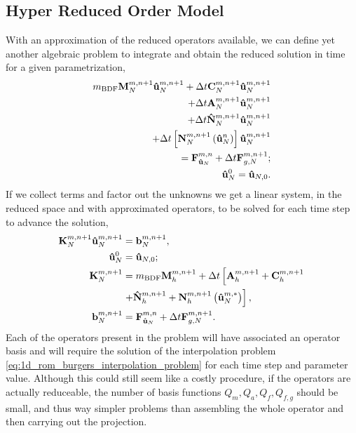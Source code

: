 \documentclass[../../thesis.tex]{subfiles}
\newcommand{\dt}{\ensuremath{\Delta t}}
\newcommand{\Ahm}[1]{\ensuremath{\vb{#1}^{m, n+1}_h}}
\begin{document}
\subsection{Hyper Reduced Order Model}
With an approximation of the reduced operators available, 
we can define yet another algebraic problem to integrate and 
obtain the reduced solution in time for a given parametrization,
\begin{subequations}
    \label{eq:1d_hrom_weak_formulation_discrete}
    \begin{align}
        m_{\text{BDF}} \vb{M}^{m, n+1}_{N} \vb{\hat{u}}_{N}^{m, n+1}
        + \dt \vb{C}^{m, n+1}_{N} \vb{\hat{u}}_{N}^{m, n+1}
        \nonumber 
        \\ 
        + \dt \vb{A}^{m, n+1}_{N} \vb{\hat{u}}_{N}^{m, n+1}
        \nonumber 
        \\ 
        + \dt \vb{\hat{N}}^{m, n+1}_{N} \vb{\hat{u}}_{N}^{m, n+1}
        \nonumber 
        \\ 
        + \dt \left[\vb{N}^{m, n+1}_{N}\left(\vb{\hat{u}}_{N}^{n}\right)\right] \vb{\hat{u}}_{N}^{m, n+1}
        \nonumber
        \\
        = \vb{F}_{\vb{\hat{u}}_{N}}^{m, n}
        + \dt \vb{F}_{g,N}^{m, n+1};
        \\
        \vb{\hat{u}}_N^{0} = \vb{\hat{u}}_{N,0}.
    \end{align}
\end{subequations}
If we collect terms and factor out the unknowns we get a linear system, 
in the reduced space and with approximated operators, 
to be solved for each time step to advance the solution,
\begin{subequations}
    \label{eq:1d_hrom_linear_system_timestep}
    \begin{align}
        \vb{K}_{N}^{m, n+1} \vb{\hat{u}}_{N}^{m, n+1} &= \vb{b}_{N}^{m, n+1}, 
        \\
        \vb{\hat{u}}_{N}^{0} &= \vb{\hat{u}}_{N,0};
        \\
        \vb{K}_{N}^{m, n+1} &= m_{\text{BDF}} \Ahm{M} + \dt \left[\Ahm{A} + \Ahm{C} \right. 
        \nonumber 
        \\
                        &\left. + \Ahm{\hat{N}} + \Ahm{N}\left(\vb{\hat{u}}_{N}^{m, *}\right)\right],
        \\
        \vb{b}_{N}^{m, n+1} &= \vb{F}_{\vb{\hat{u}}_{N}}^{m,n} + \dt \vb{F}_{g,N}^{m, n+1}.
    \end{align}
\end{subequations}
Each of the operators present in the problem will have associated 
an operator basis and will require the solution of 
the interpolation problem \eqref{eq:1d_rom_burgers_interpolation_problem} 
for each time step and parameter value.
Although this could still seem like a costly procedure, 
if the operators are actually reduceable, 
the number of basis functions $Q_m, Q_a, Q_f, Q_{f,g}$ should be small,
and thus way simpler problems than assembling the whole operator and 
then carrying out the projection.
\end{document}
